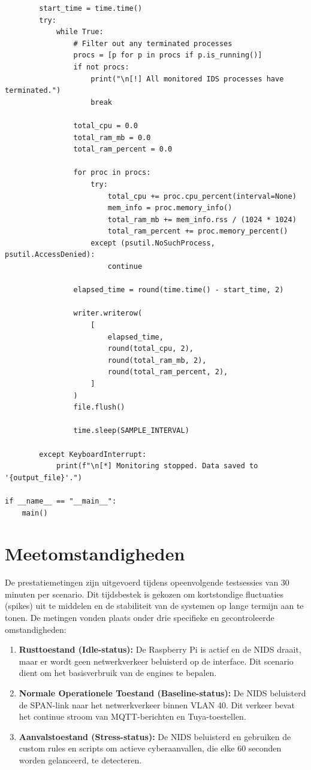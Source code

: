 \begin{verbatim}
        start_time = time.time()
        try:
            while True:
                # Filter out any terminated processes
                procs = [p for p in procs if p.is_running()]
                if not procs:
                    print("\n[!] All monitored IDS processes have terminated.")
                    break

                total_cpu = 0.0
                total_ram_mb = 0.0
                total_ram_percent = 0.0

                for proc in procs:
                    try:
                        total_cpu += proc.cpu_percent(interval=None)
                        mem_info = proc.memory_info()
                        total_ram_mb += mem_info.rss / (1024 * 1024)
                        total_ram_percent += proc.memory_percent()
                    except (psutil.NoSuchProcess, psutil.AccessDenied):
                        continue

                elapsed_time = round(time.time() - start_time, 2)

                writer.writerow(
                    [
                        elapsed_time,
                        round(total_cpu, 2),
                        round(total_ram_mb, 2),
                        round(total_ram_percent, 2),
                    ]
                )
                file.flush()

                time.sleep(SAMPLE_INTERVAL)

        except KeyboardInterrupt:
            print(f"\n[*] Monitoring stopped. Data saved to '{output_file}'.")

if __name__ == "__main__":
    main()
\end{verbatim}


\section{Meetomstandigheden}
De prestatiemetingen zijn uitgevoerd tijdens opeenvolgende testsessies van 30 minuten per scenario. Dit tijdsbestek is gekozen om kortstondige fluctuaties (spikes) uit te middelen en de stabiliteit van de systemen op lange termijn aan te tonen. 
De metingen vonden plaats onder drie specifieke en gecontroleerde omstandigheden:
\begin{enumerate}
    \item \textbf{Rusttoestand (Idle-status):} De Raspberry Pi is actief en de NIDS draait, maar er wordt geen netwerkverkeer beluisterd op de interface. Dit scenario dient om het basisverbruik van de engines te bepalen.
    \item \textbf{Normale Operationele Toestand (Baseline-status):} De NIDS beluisterd de SPAN-link naar het netwerkverkeer binnen VLAN 40. Dit verkeer bevat het continue stroom van MQTT-berichten en Tuya-toestellen.
    \item \textbf{Aanvalstoestand (Stress-status):} De NIDS beluisterd en gebruiken de custom rules en scripts om actieve cyberaanvallen, die elke 60 seconden worden gelanceerd, te detecteren.
\end{enumerate}

